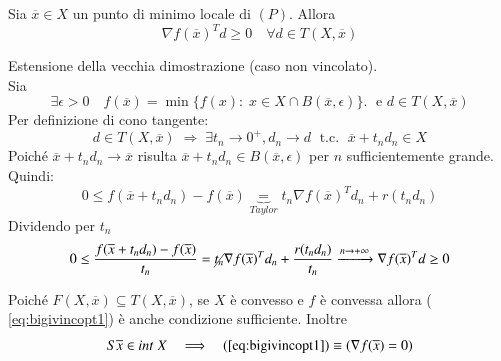 \begin{theo}
Sia $\overline{x} \in X$ un punto di minimo locale di $(P)$. Allora
\begin{equation}
  \label{eq:bigivincopt1}
 \nabla f(\overline{x})^{T} d \geq 0 \quad
\forall d \in T(X, \overline{x})
\end{equation}
\end{theo}
\begin{thproof}
Estensione della vecchia dimostrazione (caso non vincolato). \\
Sia
$$ \exists \epsilon > 0 \quad f(\overline{x}) =
\min\{f(x): \; x \in X \cap B(\overline{x}, \epsilon) \}.
\; \text{ e } d \in T(X, \overline{x})$$
Per definizione di cono tangente:
$$ d \in T(X, \overline{x}) \; \Rightarrow \; \exists t_n \rightarrow 0^{+}, d_n \to d \; \text{ t.c. } \;
\overline{x} + t_n d_n \in X$$
Poich\'e
$\overline{x} + t_n d_n \rightarrow \overline{x}$ risulta
$\overline{x} + t_n d_n \in  B(\overline{x}, \epsilon) $
per $n$ sufficientemente grande. Quindi:
$$ 0 \leq f(\overline{x} + t_n d_n) - f(\overline{x})
\underbrace{=}_{Taylor}  t_n \nabla f(\overline{x})^{T}d_n +
r(t_n d_n)
$$
Dividendo per $t_n$
$$ 0 \leq \dfrac{f(\overline{x} + t_n d_n) - f(\overline{x})}{t_n} =
\cancel{t_n }\nabla f(\overline{x})^{T}d_n +
\dfrac{r(t_n d_n)}{t_n} \xrightarrow{n \to + \infty} \nabla f(\overline{x})^{T}d \geq 0
$$
\end{thproof}

\begin{observation}
Poich\'e $F(X, \overline{x})\subseteq T(X, \overline{x})$,
se $X$ \`e convesso e $f$ \`e convessa allora
(  \ref{eq:bigivincopt1}) \`e anche condizione sufficiente.
Inoltre 
$$S
\overline{x} \in int\; X \quad
\Longrightarrow \quad (  \ref{eq:bigivincopt1})
 \equiv (\nabla f(\overline{x}) = 0)$$
\end{observation}

